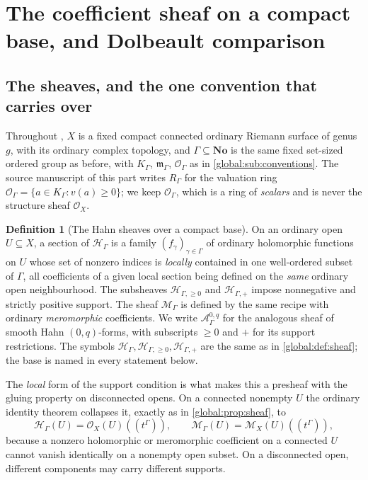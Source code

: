 \documentclass[11pt,letterpaper]{article}
\theoremstyle{definition}
\newtheorem{definition}[definition]{Definition}
\theoremstyle{remark}
\newcommand{\No}{\mathbf{No}}
\newcommand{\OO}{\mathcal O}
\newcommand{\HH}{\mathscr H_\Gamma}
\newcommand{\HP}{\mathscr H_{\Gamma,+}}
\newcommand{\HI}{\mathscr H_{\Gamma,\ge0}}
\newcommand{\KK}{K_\Gamma}
\newcommand{\mK}{\mathfrak m_\Gamma}
\newcommand{\MG}{\mathscr M_\Gamma}
\numberwithin{equation}{section}
\begin{document}
\section{The coefficient sheaf on a compact base, and Dolbeault comparison}\label{global:sec:compactsheaf}

\subsection{The sheaves, and the one convention that carries over}

Throughout , $X$ is a fixed compact connected ordinary Riemann surface of genus $g$, with its ordinary complex topology, and $\Gamma\subseteq\No$ is the same fixed set-sized ordered group as before, with $\KK$, $\mK$, $\OO_\Gamma$ as in \cref{global:sub:conventions}. The source manuscript of this part writes $R_\Gamma$ for the valuation ring $\OO_\Gamma=\{a\in\KK:v(a)\ge0\}$; we keep $\OO_\Gamma$, which is a ring of \emph{scalars} and is never the structure sheaf $\OO_X$.

\begin{definition}[The Hahn sheaves over a compact base]\label{global:def:compactsheaf}
On an ordinary open $U\subseteq X$, a section of $\HH$ is a family $(f_\gamma)_{\gamma\in\Gamma}$ of ordinary holomorphic functions on $U$ whose set of nonzero indices is \emph{locally} contained in one well-ordered subset of $\Gamma$, all coefficients of a given local section being defined on the \emph{same} ordinary open neighbourhood. The subsheaves $\HI$ and $\HP$ impose nonnegative and strictly positive support. The sheaf $\MG$ is defined by the same recipe with ordinary \emph{meromorphic} coefficients. We write $\mathscr A^{0,q}_\Gamma$ for the analogous sheaf of smooth Hahn $(0,q)$-forms, with subscripts $\ge0$ and $+$ for its support restrictions. The symbols $\HH,\HI,\HP$ are the same as in \cref{global:def:sheaf}; the base is named in every statement below.
\end{definition}

The \emph{local} form of the support condition is what makes this a presheaf with the gluing property on disconnected opens. On a connected nonempty $U$ the ordinary identity theorem collapses it, exactly as in \cref{global:prop:sheaf}, to
\begin{equation}\label{global:eq:connectedsections}
  \HH(U)=\OO_X(U)((t^\Gamma)),\qquad \MG(U)=\mathscr M_X(U)((t^\Gamma)),
\end{equation}
because a nonzero holomorphic or meromorphic coefficient on a connected $U$ cannot vanish identically on a nonempty open subset. On a disconnected open, different components may carry different supports.
\end{document}
